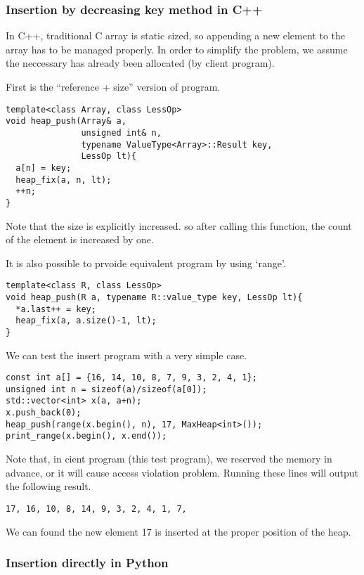 \documentclass{article}
\begin{document}
\subsubsection*{Insertion by decreasing key method in C++}
In C++, traditional C array is static sized, so appending a new element
to the array has to be managed properly. In order to simplify the
problem, we assume the neccessary has already been allocated (by
client program).

First is the ``reference + size'' version of program.

\lstset{language=C++}
\begin{lstlisting}
template<class Array, class LessOp>
void heap_push(Array& a, 
               unsigned int& n,
               typename ValueType<Array>::Result key,
               LessOp lt){
  a[n] = key; 
  heap_fix(a, n, lt);
  ++n;
}
\end{lstlisting}

Note that the size is explicitly increased. so after calling this
function, the count of the element is increased by one.

It is also possible to prvoide equivalent program by using `range'.

\begin{lstlisting}
template<class R, class LessOp>
void heap_push(R a, typename R::value_type key, LessOp lt){
  *a.last++ = key;
  heap_fix(a, a.size()-1, lt);
}
\end{lstlisting}

We can test the insert program with a very simple case.

\begin{lstlisting}
const int a[] = {16, 14, 10, 8, 7, 9, 3, 2, 4, 1};
unsigned int n = sizeof(a)/sizeof(a[0]);
std::vector<int> x(a, a+n);
x.push_back(0);
heap_push(range(x.begin(), n), 17, MaxHeap<int>());
print_range(x.begin(), x.end());
\end{lstlisting}

Note that, in cient program (this test program), we
reserved the memory in advance, or it will cause
access violation problem. 
Running these lines will output the following result.

\begin{verbatim}
17, 16, 10, 8, 14, 9, 3, 2, 4, 1, 7,
\end{verbatim}

We can found the new element 17 is inserted at the proper
position of the heap.

\subsubsection*{Insertion directly in Python}
\end{document}
